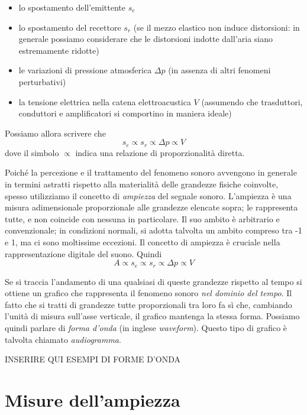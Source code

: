\documentclass[11pt]{report}
\begin{document}
\begin{itemize}
\item lo spostamento dell'emittente $s_e$
\item lo spostamento del recettore $s_r$ (se il mezzo elastico non induce distorsioni: in generale possiamo considerare che le distorsioni indotte dall'aria siano estremamente ridotte)
\item le variazioni di pressione atmosferica $\Delta p$ (in assenza di altri fenomeni perturbativi)
\item la tensione elettrica nella catena elettroacustica $V$ (assumendo che trasduttori, conduttori e amplificatori si comportino in maniera ideale)
\end{itemize}

Possiamo allora scrivere che
\begin{equation}
s_e \propto s_r \propto \Delta p \propto V
\end{equation}
dove il simbolo $\propto$ indica una relazione di proporzionalità diretta.

Poiché la percezione e il trattamento del fenomeno sonoro avvengono in generale in termini astratti rispetto alla materialità delle grandezze fisiche coinvolte, spesso utilizziamo il concetto di \emph{ampiezza} del segnale sonoro. L'ampiezza è una misura adimensionale proporzionale alle grandezze elencate sopra; le rappresenta tutte, e non coincide con nessuna in particolare. Il suo ambito è arbitrario e convenzionale; in condizioni normali, si adotta talvolta un ambito compreso tra -1 e 1, ma ci sono moltissime eccezioni. Il concetto di ampiezza è cruciale nella rappresentazione digitale del suono. Quindi
\begin{equation}
A \propto s_e \propto s_r \propto \Delta p \propto V
\end{equation}

Se si traccia l'andamento di una qualsiasi di queste grandezze rispetto al tempo si ottiene un grafico che rappresenta il fenomeno sonoro \emph{nel dominio del tempo}. Il fatto che si tratti di grandezze tutte proporzionali tra loro fa sì che, cambiando l'unità di misura sull'asse verticale, il grafico mantenga la stessa forma. Possiamo quindi parlare di \emph{forma d'onda} (in inglese \emph{waveform}). Questo tipo di grafico è talvolta chiamato \emph{audiogramma}.



INSERIRE QUI ESEMPI DI FORME D'ONDA

\section{Misure dell'ampiezza}
\end{document}
